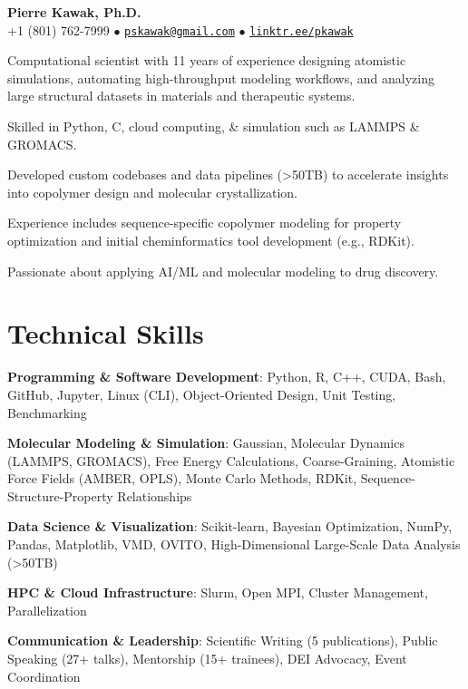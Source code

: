 \begin{center}
  {\LARGE \textbf{Pierre Kawak, Ph.D.} }\\[1ex]
  +1 (801) 762-7999 $\bullet$ \href{mailto:pskawak@gmail.com}{\tt pskawak@gmail.com} $\bullet$ \href{https://linktr.ee/pkawak}{\tt linktr.ee/pkawak}\\
\end{center}
\begin{tabitemize}
  \item Computational scientist with 11 years of experience designing atomistic simulations, automating high-throughput modeling workflows, and analyzing large structural datasets in materials and therapeutic systems.
  \item Skilled in Python, C, cloud computing, \& simulation such as LAMMPS \& GROMACS.
  \item Developed custom codebases and data pipelines (>50TB) to accelerate insights into copolymer design and molecular crystallization.
  \item Experience includes sequence-specific copolymer modeling for property optimization and initial cheminformatics tool development (e.g., RDKit).
  \item Passionate about applying AI/ML and molecular modeling to drug discovery.
\end{tabitemize}
\vspace{-1.4\baselineskip}
\section*{Technical Skills}
\begin{tabitemize}
  \item \textbf{Programming \& Software Development}: Python, R, C++, CUDA, Bash, GitHub, Jupyter, Linux (CLI), Object-Oriented Design, Unit Testing, Benchmarking
  \item \textbf{Molecular Modeling \& Simulation}: Gaussian, Molecular Dynamics (LAMMPS, GROMACS), Free Energy Calculations, Coarse-Graining, Atomistic Force Fields (AMBER, OPLS), Monte Carlo Methods, RDKit, Sequence-Structure-Property Relationships
  \item \textbf{Data Science \& Visualization}: Scikit-learn, Bayesian Optimization, NumPy, Pandas, Matplotlib, VMD, OVITO, High-Dimensional Large-Scale Data Analysis (>50TB)
  \item \textbf{HPC \& Cloud Infrastructure}: Slurm, Open MPI, Cluster Management, Parallelization
  \item \textbf{Communication \& Leadership}: Scientific Writing (5 publications), Public Speaking (27+ talks), Mentorship (15+ trainees), DEI Advocacy, Event Coordination
\end{tabitemize}
\vspace{-1.2\baselineskip}
